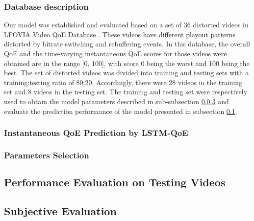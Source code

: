   \subsubsection{Database description} \label{section:DatabaseDescription}
    Our model was established and evaluated based on a set of 36 distorted videos in LFOVIA Video QoE Database \cite{LFOVIA}. These videos have different playout patterns distorted by bitrate switching and rebuffering events. In this database, the overall QoE and the time-varying instantaneous QoE scores for those videos were obtained are in the range [0, 100], with score 0 being the worst and 100 being the best. The set of distorted videos was divided into training and testing sets with a training:testing ratio of 80:20. Accordingly, there were 28 videos in the training set and 8 videos in the testing set. The training and testing set were respectively used to obtain the model parameters described in sub-subsection \ref{parameter} and evaluate the prediction performance of the model presented in subsection \ref{section:ObjectiveEvaluation}.

  \subsubsection{Instantaneous QoE Prediction by LSTM-QoE}
  

  \subsubsection{Parameters Selection}
  \label{parameter}
  

\subsection{Performance Evaluation on Testing Videos}
\label{section:ObjectiveEvaluation}
  
  

\subsection{Subjective Evaluation}
\label{section:SubjectiveEvaluation}

  

